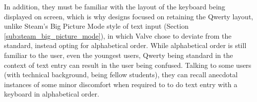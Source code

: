 \documentclass[requirements.tex]{subfiles}
\begin{document}
In addition, they must be familiar with the layout of the keyboard being
displayed on screen, which is why designs focused on retaining the Qwerty
layout, unlike Steam's Big Picture Mode style of text input (Section
\ref{sub:steam_big_picture_mode}), in which Valve chose to deviate from the 
standard, instead opting for alphabetical order. While alphabetical order is
still familiar to the user, even the youngest users, Qwerty being standard in
the context of text entry can result in the user being confused. Talking to
some users (with technical background, being fellow students), they can recall
anecdotal instances of some minor discomfort when required to to do text entry
with a keyboard in alphabetical order.
\end{document}
